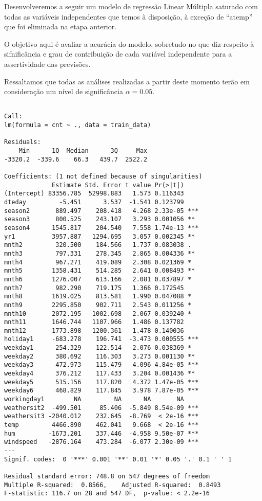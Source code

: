 \documentclass[
  letterpaper,
  DIV=11,
  numbers=noendperiod]{scrartcl}
\begin{document}
Desenvolveremos a seguir um modelo de regressão Linear Múltipla saturado
com todas as variáveis independentes que temos à disposição, à exceção
de ``atemp'' que foi eliminada na etapa anterior.

O objetivo aqui é avaliar a acurácia do modelo, sobretudo no que diz
respeito à sifnificância e grau de contribuição de cada variável
independente para a assertividade das previsões.

Ressaltamos que todas as análises realizadas a partir deste momento
terão em consideração um nível de significância \(\alpha = 0.05\).

\begin{verbatim}

Call:
lm(formula = cnt ~ ., data = train_data)

Residuals:
    Min      1Q  Median      3Q     Max 
-3320.2  -339.6    66.3   439.7  2522.2 

Coefficients: (1 not defined because of singularities)
             Estimate Std. Error t value Pr(>|t|)    
(Intercept) 83356.785  52998.883   1.573 0.116343    
dteday         -5.451      3.537  -1.541 0.123799    
season2       889.497    208.418   4.268 2.33e-05 ***
season3       800.525    243.107   3.293 0.001056 ** 
season4      1545.817    204.540   7.558 1.74e-13 ***
yr1          3957.887   1294.695   3.057 0.002345 ** 
mnth2         320.500    184.566   1.737 0.083038 .  
mnth3         797.331    278.345   2.865 0.004336 ** 
mnth4         967.271    419.089   2.308 0.021369 *  
mnth5        1358.431    514.285   2.641 0.008493 ** 
mnth6        1276.007    613.166   2.081 0.037897 *  
mnth7         982.290    719.175   1.366 0.172545    
mnth8        1619.025    813.581   1.990 0.047088 *  
mnth9        2295.850    902.711   2.543 0.011256 *  
mnth10       2072.195   1002.698   2.067 0.039240 *  
mnth11       1646.744   1107.966   1.486 0.137782    
mnth12       1773.898   1200.361   1.478 0.140036    
holiday1     -683.278    196.741  -3.473 0.000555 ***
weekday1      254.329    122.514   2.076 0.038369 *  
weekday2      380.692    116.303   3.273 0.001130 ** 
weekday3      472.973    115.479   4.096 4.84e-05 ***
weekday4      376.212    117.433   3.204 0.001436 ** 
weekday5      515.156    117.820   4.372 1.47e-05 ***
weekday6      468.829    117.845   3.978 7.87e-05 ***
workingday1        NA         NA      NA       NA    
weathersit2  -499.501     85.406  -5.849 8.54e-09 ***
weathersit3 -2040.012    232.645  -8.769  < 2e-16 ***
temp         4466.890    462.041   9.668  < 2e-16 ***
hum         -1673.201    337.446  -4.958 9.50e-07 ***
windspeed   -2876.164    473.284  -6.077 2.30e-09 ***
---
Signif. codes:  0 '***' 0.001 '**' 0.01 '*' 0.05 '.' 0.1 ' ' 1

Residual standard error: 748.8 on 547 degrees of freedom
Multiple R-squared:  0.8566,    Adjusted R-squared:  0.8493 
F-statistic: 116.7 on 28 and 547 DF,  p-value: < 2.2e-16
\end{verbatim}
\end{document}
